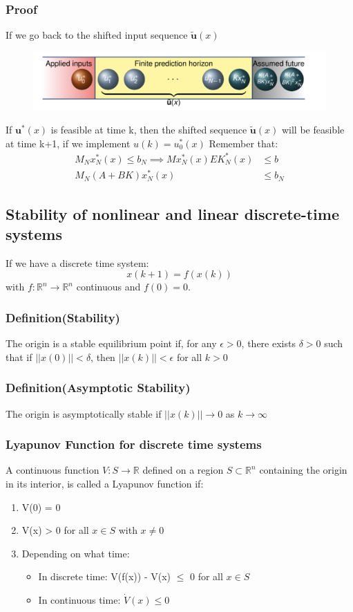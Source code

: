 \documentclass{article}
\begin{document}
\subsubsection*{Proof}
If we go back to the shifted input sequence $\tilde{\textbf{u}}(x)$
\begin{figure}[H]
    \centering
    \includegraphics[width=0.6\linewidth]{Screenshot 2023-02-28 at 15.11.31.png}
\end{figure}
If $\textbf{u}^*(x)$ is feasible at time k, then the shifted sequence $\tilde{\textbf{u}}(x)$ will be feasible at time k+1, if we implement $u(k) = u_0^*(x)$
Remember that:
\[
\begin{aligned}
M_Nx^*_N (x) \leq b_N \implies Mx_N^*(x) EK^*_N(x) &\leq b \\
M_N(A+BK)x_N^*(x) &\leq b_N
\end{aligned}
\]
\subsection{Stability of nonlinear and linear discrete-time systems}
If we have a discrete time system:
\[
x(k+1) = f(x(k))
\]
with $f : \mathbb R^n \rightarrow \mathbb R^n$ continuous and $f(0) = 0$. 
\subsubsection*{Definition(Stability)}
The origin is a stable equilibrium point if, for any $\epsilon > 0$, there exists $ \delta > 0$ such that if $||x(0)|| < \delta$, then $||x(k)|| < \epsilon$ for all $k > 0$
\subsubsection*{Definition(Asymptotic Stability)}
The origin is asymptotically stable if $||x(k)|| \rightarrow 0$ as $k \rightarrow \infty$
\subsubsection{Lyapunov Function for discrete time systems}
A continuous function $V : S \rightarrow \mathbb R$ defined on a region $S \subset \mathbb R^n$ containing the origin in its interior, is called a Lyapunov function if:
\begin{enumerate}
    \item V(0) = 0
    \item V(x) > 0 for all $x \in S$ with $x \neq 0$
    \item Depending on what time:
    \begin{itemize}
        \item In discrete time: V(f(x)) - V(x) $\leq$ 0 for all $x \in S$
        \item In continuous time: $\dot V(x) \leq 0$
    \end{itemize}
\end{enumerate}
\end{document}
